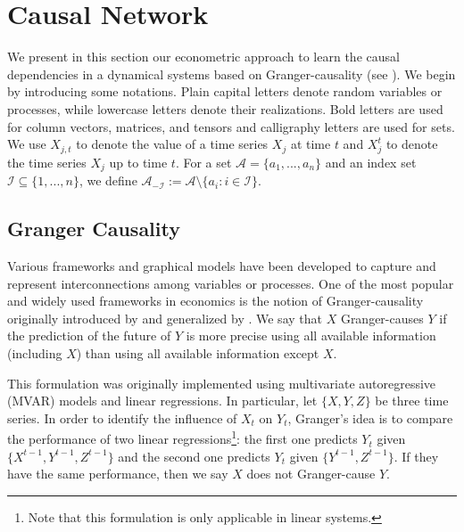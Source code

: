 

\section{Causal Network}\label{Sec1}

We present in this section our econometric approach to learn the causal dependencies in a dynamical systems based on Granger-causality (see \citet{granger}). 
We begin by introducing some notations.
Plain capital letters denote random variables or processes, while lowercase letters denote their realizations. 
Bold letters are used for column vectors, matrices, and tensors and calligraphy letters are used for sets. 
We use $X_{j,t}$ to denote the value of a time series $X_j$ at time $t$ 
and $X^{t}_j$ to denote the time series $X_j$ up to time $t$. 
For a set $\mathcal{A}=\{a_1,...,a_n\}$ and an index set $\mathcal{I}\subseteq\{1,...,n\}$, we define $\mathcal{A}_{-\mathcal{I}}:=\mathcal{A}\setminus\{a_i: i\in\mathcal{I}\}$. 



\subsection{Granger Causality}\label{sec:granger}

Various frameworks and graphical models have been developed to capture and represent interconnections among variables or processes.
One of the most popular and widely used frameworks in economics is the notion of Granger-causality originally introduced by \citet{wiener1956theory} and
generalized by \citet{granger}. We say that $X$ Granger-causes $Y$ if the prediction of the future of $Y$ is more precise using all available information (including $X$) than using all available information except $X$.

This formulation was originally implemented using multivariate autoregressive (MVAR) models and linear regressions.
In particular, let $\{X,Y,Z\}$ be three time series. In order to identify the influence of $X_t$ on $Y_t$, Granger's idea is to compare the performance of two linear regressions\footnote{Note that this formulation is only applicable in linear systems.}: the first one predicts $Y_t$ given $\{X^{t-1},Y^{t-1},Z^{t-1}\}$ and the second one predicts $Y_t$ given $\{Y^{t-1},Z^{t-1}\}$. If they have the same performance, then we say $X$ does not Granger-cause $Y$.

